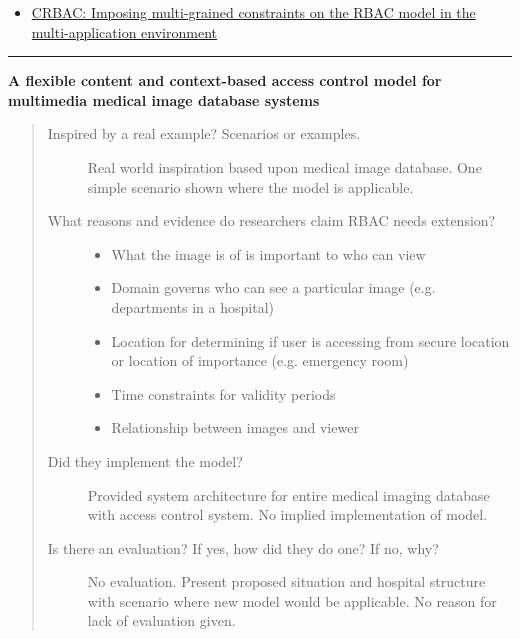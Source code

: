 \documentclass[letterpaper,10pt,english]{sphinxmanual}
\begin{document}
\begin{description}
\begin{itemize}
\item {} 
\href{http://www.sciencedirect.com.prox.lib.ncsu.edu/science/article/pii/S1084804508000520}{CRBAC: Imposing multi-grained constraints on the RBAC model in the multi-application environment}

\end{itemize}

\end{description}


\bigskip\hrule{}\bigskip


\textbf{A flexible content and context-based access control model for multimedia medical image database systems}
\begin{quote}
\begin{description}
\item[{Inspired by a real example? Scenarios or examples.}] \leavevmode
Real world inspiration based upon medical image database.  One simple scenario shown where the model is applicable.

\item[{What reasons and evidence do researchers claim RBAC needs extension?}] \leavevmode\begin{itemize}
\item {} 
What the image is of is important to who can view

\item {} 
Domain governs who can see a particular image (e.g. departments in a hospital)

\item {} 
Location for determining if user is accessing from secure location or location of importance (e.g. emergency room)

\item {} 
Time constraints for validity periods

\item {} 
Relationship between images and viewer

\end{itemize}

\item[{Did they implement the model?}] \leavevmode
Provided system architecture for entire medical imaging database with access control system. No implied implementation of model.

\item[{Is there an evaluation? If yes, how did they do one? If no, why?}] \leavevmode
No evaluation.  Present proposed situation and hospital structure with scenario where new model would be applicable. No reason for lack of evaluation given.


\end{description}
\end{quote}
\end{document}
